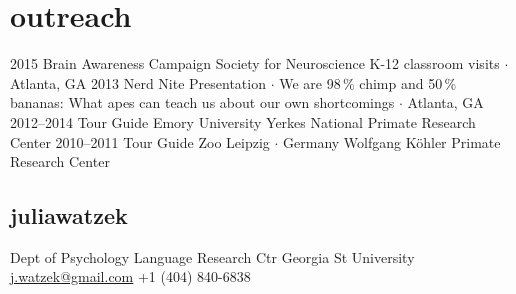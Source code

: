 \documentclass[]{friggeri-cv}
\begin{document}
\section{outreach}

\begin{entrylist}
  \entry
    {2015}
    {Brain Awareness Campaign}
    {Society for Neuroscience}
    {K-12 classroom visits $\cdot$ Atlanta, GA}
  \entry
    {2013}
    {Nerd Nite}
    {}
    {Presentation $\cdot$ We are 98\,\% chimp and 50\,\% bananas: What apes can teach us about our own shortcomings $\cdot$ Atlanta, GA}
  \entry
    {2012--2014}
    {Tour Guide}
    {Emory University}
    {Yerkes National Primate Research Center}
  \entry
    {2010--2011}
    {Tour Guide}
    {Zoo Leipzig $\cdot$ Germany}
    {Wolfgang K\"{o}hler Primate Research Center}
\end{entrylist}

\begin{aside}
  \section{{\normalfont julia}watzek}
    Dept of Psychology
    Language Research Ctr
    Georgia St University
    ~
    \href{mailto:j.watzek@gmail.com}{j.watzek@gmail.com}
    +1 (404) 840-6838
\end{aside}
\end{document}
